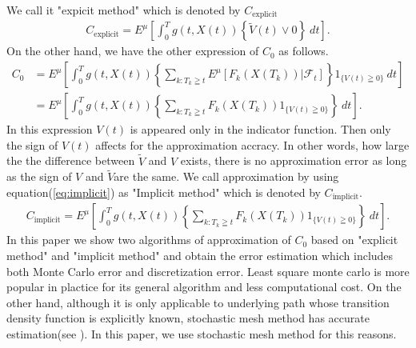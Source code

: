 \documentclass[12pt]{article}
\begin{document}
We call it "expicit method" which is denoted by $C_{\text{explicit}}$
\begin{align}
    C_{\text{explicit}}=E^{\mu}\left[\int_{0}^T g(t, X(t))\left\{\tilde{V}(t) \vee0 \right \} \ dt \right].
\end{align}
On the other hand, we have the other expression of $C_0$ as follows.
\begin{align}\label{eq:implicit}
  C_0 &= E^{\mu}\left[\int_{0}^T g(t, X(t)) \left\{ \sum_{k:T_k\geqq t} E^{\mu} \left[ F_k({X}(T_k)) |\mathcal{F}_t \right]\right \} 1_{\{V(t) \geqq 0\}}\ dt \right]\nonumber \\
      &=E^{\mu}\left[\int_{0}^T  g(t, X(t)) \left\{ \sum_{k:T_k\geqq t} F_k({X}(T_k)) 1_{\{V(t) \geqq 0\}}\right \} \ dt \right].
\end{align}
In this expression $V(t)$ is appeared only in the indicator function. Then only the sign of
$V(t)$ affects for the approximation accracy. In other words, how large the the difference between
$\tilde{V}$ and $V$ exists, there is no approximation error as long as the sign of $V$ and $\tilde{V}$are the same.
We call approximation by using equation(\ref{eq:implicit}) as "Implicit method" which is denoted by $C_{\text{implicit}}$.
\begin{align}
    C_{\text{implicit}}=E^{\mu}\left[\int_{0}^Tg(t, X(t)) \left\{ \sum_{k:T_k\geqq t} F_k({X}(T_k)) 1_{\{V(t) \geqq 0\}}\right \} \ dt \right].
\end{align}
In this paper we show two algorithms of approximation of $C_0$ based on "explicit method" and 
"implicit method" and obtain the error estimation which includes both Monte Carlo error and
discretization error.
Least square monte carlo is more popular in plactice for its general algorithm and
less computational cost.
On the other hand, although it is only applicable to underlying path whose transition density function is  explicitly known, stochastic mesh method has accurate estimation(see \cite{KM}).
In this paper, we use stochastic mesh method for this reasons.
\end{document}
